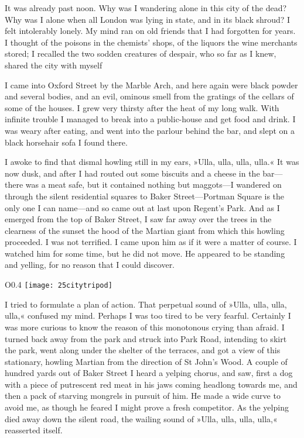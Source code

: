 It was already past noon. Why was I wandering alone in this city of the dead? Why was I alone when all London was lying in state, and in its black shroud? I felt intolerably lonely. My mind ran on old friends that I had forgotten for years. I thought of the poisons in the chemists' shops, of the liquors the wine merchants stored; I recalled the two sodden creatures of despair, who so far as I knew, shared the city with myself\textellipsis

I came into Oxford Street by the Marble Arch, and here again were black powder and several bodies, and an evil, ominous smell from the gratings of the cellars of some of the houses. I grew very thirsty after the heat of my long walk. With infinite trouble I managed to break into a public-house and get food and drink. I was weary after eating, and went into the parlour behind the bar, and slept on a black horsehair sofa I found there.

I awoke to find that dismal howling still in my ears, »Ulla, ulla, ulla, ulla.« It was now dusk, and after I had routed out some biscuits and a cheese in the bar—there was a meat safe, but it contained nothing but maggots—I wandered on through the silent residential squares to Baker Street—Portman Square is the only one I can name—and so came out at last upon Regent's Park. And as I emerged from the top of Baker Street, I saw far away over the trees in the clearness of the sunset the hood of the Martian giant from which this howling proceeded. I was not terrified. I came upon him as if it were a matter of course. I watched him for some time, but he did not move. He appeared to be standing and yelling, for no reason that I could discover.

\begin{wrapfigure}{O}{0.4\textwidth}
\centering
\texttt{[image: 25citytripod]}
\end{wrapfigure}

I tried to formulate a plan of action. That perpetual sound of »Ulla, ulla, ulla, ulla,« confused my mind. Perhaps I was too tired to be very fearful. Certainly I was more curious to know the reason of this monotonous crying than afraid. I turned back away from the park and struck into Park Road, intending to skirt the park, went along under the shelter of the terraces, and got a view of this stationary, howling Martian from the direction of St John's Wood. A couple of hundred yards out of Baker Street I heard a yelping chorus, and saw, first a dog with a piece of putrescent red meat in his jaws coming headlong towards me, and then a pack of starving mongrels in pursuit of him. He made a wide curve to avoid me, as though he feared I might prove a fresh competitor. As the yelping died away down the silent road, the wailing sound of »Ulla, ulla, ulla, ulla,« reasserted itself.

